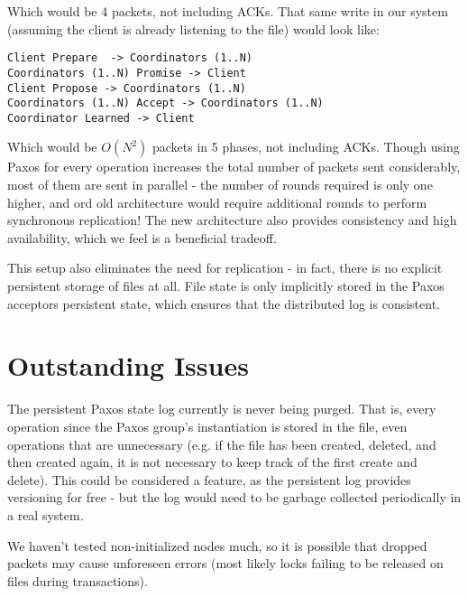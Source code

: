 \documentclass[11pt]{article}
\begin{document}
Which would be 4 packets, not including ACKs.
That same write in our system (assuming the client is already listening to the file) would look like:

\begin{verbatim}
Client Prepare  -> Coordinators (1..N)
Coordinators (1..N) Promise -> Client
Client Propose -> Coordinators (1..N)
Coordinators (1..N) Accept -> Coordinators (1..N)
Coordinator Learned -> Client
\end{verbatim}

Which would be $O(N^2)$ packets in 5 phases, not including ACKs.
Though using Paxos for every operation increases the total number of packets sent considerably, most of them are sent in parallel -
the number of rounds required is only one higher, and ord old architecture would require additional rounds to perform synchronous replication! 
The new architecture also provides consistency and high availability, which we feel is a beneficial tradeoff.

This setup also eliminates the need for replication - in fact, there is no explicit persistent storage of files at all. 
File state is only implicitly stored in the Paxos acceptors persistent state, which ensures that the distributed log is consistent.

\section{Outstanding Issues}

The persistent Paxos state log currently is never being purged.
That is, every operation since the Paxos group's instantiation is stored in the file, even operations that are unnecessary (e.g. if the file has been created, deleted, and then created again, it is not necessary to keep track of the first create and delete).
This could be considered a feature, as the persistent log provides versioning for free - but the log would need to be garbage collected periodically in a real system.

We haven't tested non-initialized nodes much, so it is possible that dropped packets may cause unforeseen errors (most likely locks failing to be released on files during transactions).
\end{document}
